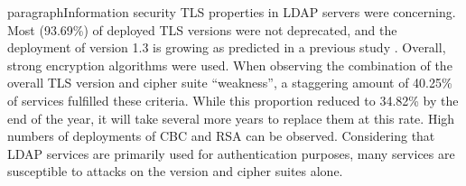 





%



\iffalse
paragraph{Information security}
\gls{TLS} properties in \gls{LDAP} servers were concerning. Most (93.69\%) of deployed \gls{TLS} versions were not deprecated, and the deployment of version 1.3 is growing as predicted in a previous study \cite{Kotzias2018}. Overall, strong encryption algorithms were used. When observing the combination of the overall TLS version and cipher suite ``weakness'', a staggering amount of 40.25\% of services fulfilled these criteria. While this proportion reduced to 34.82\% by the end of the year, it will take several more years to replace them at this rate. High numbers of deployments of CBC and RSA can be observed. Considering that LDAP services are primarily used for authentication purposes, many services are susceptible to attacks on the version and cipher suites alone.


